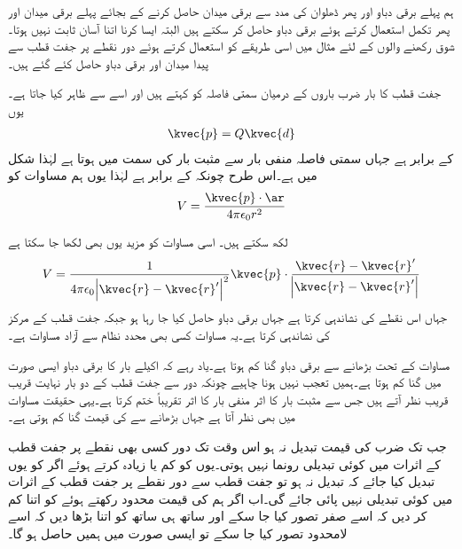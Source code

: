 ہم پہلے برقی دباو اور پھر ڈھلوان کی مدد سے برقی میدان حاصل کرنے کے بجائے پہلے برقی میدان اور پھر تکمل استعمال کرتے ہوئے برقی دباو حاصل کر سکتے ہیں البتہ ایسا کرنا اتنا آسان ثابت نہیں ہوتا۔شوق رکھنے والوں کے لئے مثال  میں اسی طریقے کو استعمال کرتے ہوئے دور نقطے پر جفت قطب  سے پیدا میدان اور برقی دباو حاصل کئے گئے ہیں۔

جفت قطب کا بار  ضرب باروں کے درمیان سمتی فاصلہ  کو   کہتے ہیں اور اسے  سے ظاہر کیا جاتا ہے۔یوں 
\begin{align}\label{مساوات_توانائی_سمتی_جفت_قطب}
\kvec{p}=Q \kvec{d}
\end{align}
کے برابر ہے جہاں سمتی فاصلہ منفی بار سے مثبت بار کی سمت میں ہوتا ہے لہٰذا شکل  میں  ہے۔اس طرح چونکہ  کے برابر ہے لہٰذا یوں ہم مساوات  کو
\begin{align}
V=\frac{\kvec{p} \cdot \ar}{4 \pi \epsilon_0 r^2}
\end{align} 

لکھ سکتے ہیں۔ اسی مساوات کو مزید یوں بھی لکھا جا سکتا ہے
\begin{align}
V=\frac{1}{4\pi \epsilon_0 \abs{\kvec{r}-\kvec{r}'}^2} \kvec{p} \cdot \frac{\kvec{r}-\kvec{r}'}{\abs{\kvec{r}-\kvec{r}'}}
\end{align}
جہاں  اس نقطے کی نشاندہی کرتا ہے جہاں برقی دباو حاصل کیا جا رہا ہو جبکہ  جفت قطب کے مرکز کی نشاندہی کرتا ہے۔یہ مساوات کسی بھی محدد نظام سے آزاد مساوات ہے۔

مساوات  کے تحت  بڑھانے سے  برقی دباو  گنا کم ہوتا ہے۔یاد رہے کہ اکیلے بار کا برقی دباو ایسی صورت میں  گنا کم ہوتا ہے۔ہمیں تعجب نہیں ہونا چاہیے چونکہ دور سے جفت قطب کے دو بار نہایت قریب قریب نظر آتے ہیں جس سے مثبت بار کا اثر منفی بار کا اثر تقریباً ختم کرتا ہے۔یہی حقیقت مساوات  میں بھی نظر آتا ہے جہاں  بڑھانے سے   کی قیمت  گنا کم ہوتی ہے۔

جب تک  ضرب  کی قیمت تبدیل نہ ہو اس وقت تک دور کسی بھی نقطے پر جفت قطب کے اثرات میں کوئی تبدیلی رونما نہیں ہوتی۔یوں  کو کم  یا زیادہ کرتے ہوئے اگر  کو یوں تبدیل کیا جائے کہ  تبدیل نہ ہو تو جفت قطب سے دور نقطے پر جفت قطب کے اثرات میں کوئی تبدیلی نہیں پائی جائے گی۔اب اگر  ہم  کی قیمت محدود رکھتے ہوئے   کو اتنا کم کر دیں کہ اسے صفر تصور  کیا جا سکے  اور ساتھ ہی ساتھ  کو اتنا بڑھا دیں کہ اسے لامحدود تصور کیا جا سکے  تو ایسی صورت میں ہمیں  حاصل ہو گا۔


